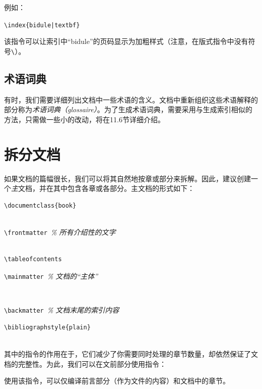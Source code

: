 例如：

\begin{dmd}
\verb+\index{bidule|textbf}+
\end{dmd}

该指令可以让索引中“bidule”的页码显示为加粗样式（注意，在版式指令中没有符号\verb|\|）。

\subsection{术语词典}

有时，我们需要详细列出文档中一些术语的含义。文档中重新组织这些术语解释的部分称为\emph{术语词典（glossaire）}。为了生成术语词典，需要采用与生成索引相似的方法，只需做一些小的改动，将在11.6节详细介绍。

\section{拆分文档}

如果文档的篇幅很长，我们可以将其自然地按章或部分来拆解。因此，建议创建一个\emph{主}文档，并在其中包含各章或各部分。主文档的形式如下：

\begin{dmd}
\begin{verbatim}
\documentclass{book}


\end{verbatim}
\verb+\frontmatter +\textsl{\% 所有介绍性的文字}
\begin{verbatim}

\tableofcontents
\end{verbatim}
\verb+\mainmatter +\textsl{\% 文档的“主体”}
\begin{verbatim}


\end{verbatim}
\verb+\backmatter +\textsl{\% 文档末尾的索引内容}
\begin{verbatim}
\bibliographstyle{plain} 


\end{verbatim}
\end{dmd}

其中的指令\verb||的作用在于，它们减少了你需要同时处理的章节数量，却依然保证了文档的完整性。为此，我们可以在文前部分使用指令\verb||：

\begin{dmd}
\verb||
\end{dmd}

使用该指令，可以仅编译前言部分（作为文件的内容）和文档中的章节。

